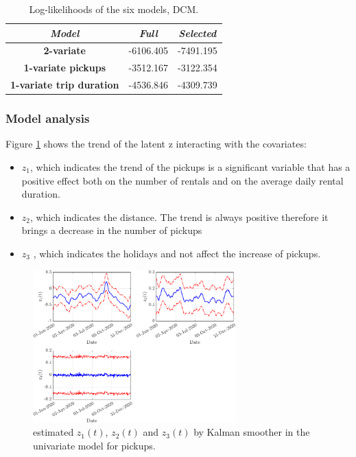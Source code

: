 \begin{table}
	\centering
	\renewcommand\arraystretch{1.3}
	\begin{tabular}{c|c|c}
		\hline
		\textit{Model} &\textit{Full} & \textit{Selected} \\ 
		\hline
		\textbf{2-variate } & -6106.405  & -7491.195    \\ 
		\hline
		\textbf{1-variate pickups } & -3512.167  & -3122.354    \\ 
		\hline
		\textbf{1-variate trip duration} & -4536.846  & -4309.739   \\ 
		\hline
	\end{tabular}
	\caption[Log-likelihoods of the six models (DCM)]{Log-likelihoods of the six models, DCM.}
	\label{Log-likelihoods DCM}
\end{table}

\subsubsection{Model analysis}

Figure \ref{Trend_zeta_latente univariato} shows the trend of the latent z interacting with the covariates:
\begin{itemize}
	\item $z_{1}$, which indicates the trend of the pickups is a significant variable that has a positive effect both on the number of rentals and on the average daily rental duration.
	\item $z_{2}$, which indicates the distance. The trend is always positive therefore it brings a decrease in the number of pickups
	\item $z_{3}$ , which indicates the holidays and not affect the increase of pickups.
\end{itemize}

\begin{figure}
	\centering
	\includegraphics[height=222px]{Images/Data analysis/DCM/Trend_z_pickups.pdf}
	\caption[Estimated $z_{1}(t)$,  $z_{2}(t)$ and $z_{3}(t)$ by Kalman smoother in the univariate model for pickups (DCM)]{estimated $z_{1}(t)$,  $z_{2}(t)$ and $z_{3}(t)$ by Kalman smoother in the univariate model for pickups.}
	\label{Trend_zeta_latente univariato}
	
\end{figure}

